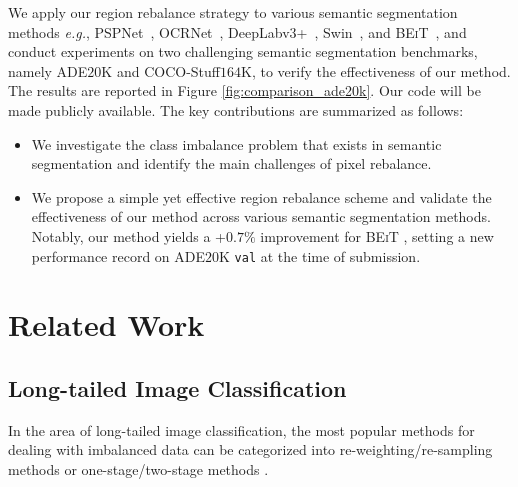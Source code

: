 \documentclass[final]{cvpr}
\begin{document}
We apply our region rebalance strategy to
various semantic segmentation methods {\it e.g.}, PSPNet~\cite{DBLP:conf/cvpr/ZhaoSQWJ17}, OCRNet~\cite{yuan2020object}, DeepLabv$3$+~\cite{chen2018encoder}, Swin~\cite{liu2021swin}, and \textsc{BEiT}~\cite{bao2021beit}, and conduct experiments on two challenging semantic segmentation benchmarks, namely ADE$20$K\cite{zhou2017scene} and COCO-Stuff$164$K\cite{caesar2018coco},
to verify the effectiveness of our method.
The results are reported in
Figure \ref{fig:comparison_ade20k}.
Our code will be made publicly available.
The key contributions are summarized as follows:
\begin{itemize}
    \vspace{-0.1in}
	\item We investigate the class imbalance problem that exists in semantic segmentation and identify the main challenges of pixel rebalance.
	\vspace{-0.1in}
	\item We propose a simple yet effective region rebalance scheme and validate the effectiveness of our method across various semantic segmentation methods. Notably, our method yields a +$0.7\%$ improvement for \textsc{BEiT} \cite{bao2021beit}, setting a new performance record on ADE$20$K \texttt{val} at the time of submission. 
\end{itemize}


\section{Related Work}
\subsection{Long-tailed Image Classification}
In the area of long-tailed image classification, the most popular methods for dealing with imbalanced data can be categorized into re-weighting/re-sampling methods \cite{shen2016relay, zhong2016towards, buda2018systematic, byrd2019effect, he2009learning, japkowicz2002class, DBLP:journals/nn/BudaMM18, DBLP:conf/cvpr/HuangLLT16,huang2019deep,wang2017learning, ren2018learning, shu2019meta, jamal2020rethinking} or one-stage/two-stage methods \cite{cao2019learning, kang2019decoupling, Zhong_2021_CVPR, zhou2019bbn,cui2021parametric,DBLP:journals/corr/abs-2101-10633}.
\end{document}
